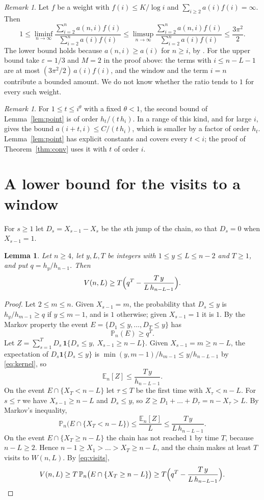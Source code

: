\documentclass[11pt]{amsart}
\newtheorem{lemma}[theorem]{Lemma}
\theoremstyle{remark}
\newtheorem{remark}[theorem]{Remark}
\numberwithin{equation}{section}
\newcommand{\E}{\mathbb{E}}
\renewcommand{\P}{\mathbb{P}}
\newcommand{\ind}{\mathbf{1}}
\begin{document}
\begin{remark}\label{rem:ratio}
Let $f$ be a weight with $f(i)\le K/\log i$ and $\sum_{i\ge2}a(i)f(i)=\infty$. Then
\[
1\le\liminf_{n\to\infty}\frac{\sum_{i=2}^{n}a(n,i)f(i)}{\sum_{i=2}^{n}a(i)f(i)}
\le\limsup_{n\to\infty}\frac{\sum_{i=2}^{n}a(n,i)f(i)}{\sum_{i=2}^{n}a(i)f(i)}\le\frac{3\pi^2}{2}.
\]
The lower bound holds because $a(n,i)\ge a(i)$ for $n\ge i$, by \cite[Theorem~1.1(i)]{BCM}. For the upper bound take
$\varepsilon=1/3$ and $M=2$ in the proof above: the terms with $i\le n-L-1$ are at most $(3\pi^2/2)\,a(i)f(i)$, and the
window and the term $i=n$ contribute a bounded amount. We do not know whether the ratio tends to $1$ for every such
weight.
\end{remark}

\begin{remark}\label{rem:bcm}
For $1\le t\le i^{\theta}$ with a fixed $\theta<1$, the second bound of Lemma~\ref{lem:point} is of order $h_t/(t\,h_i)$.
In a range of this kind, and for large $i$, \cite[Theorem~1.1(iii)]{BCM} gives the bound $a(i+t,i)\le C/(t\,h_i)$,
which is smaller by a factor of order $h_t$. Lemma~\ref{lem:point} has explicit constants and covers every $t<i$; the
proof of Theorem~\ref{thm:conv} uses it with $t$ of order $i$.
\end{remark}

\section{A lower bound for the visits to a window}\label{sec:lower}

For $s\ge1$ let $D_s=X_{s-1}-X_s$ be the $s$th jump of the chain, so that $D_s=0$ when $X_{s-1}=1$.

\begin{lemma}\label{lem:lower}
Let $n\ge4$, let $y,L,T$ be integers with $1\le y\le L\le n-2$ and $T\ge1$, and put $q=h_y/h_{n-1}$. Then
\[
V(n,L)\ge T\Bigl(q^{T}-\frac{T\,y}{L\,h_{n-L-1}}\Bigr).
\]
\end{lemma}

\begin{proof}
Let $2\le m\le n$. Given $X_{s-1}=m$, the probability that $D_s\le y$ is $h_y/h_{m-1}\ge q$ if $y\le m-1$, and is $1$
otherwise; given $X_{s-1}=1$ it is $1$. By the Markov property the event $E=\{D_1\le y,\dots,D_T\le y\}$ has
\[
\P_n(E)\ge q^{T}.
\]
Let $Z=\sum_{s=1}^{T}D_s\,\ind\{D_s\le y,\ X_{s-1}\ge n-L\}$. Given $X_{s-1}=m\ge n-L$, the expectation of
$D_s\ind\{D_s\le y\}$ is $\min(y,m-1)/h_{m-1}\le y/h_{n-L-1}$ by \eqref{eq:kernel}, so
\[
\E_n[Z]\le\frac{T\,y}{h_{n-L-1}}.
\]
On the event $E\cap\{X_T<n-L\}$ let $\tau\le T$ be the first time with $X_\tau<n-L$. For $s\le\tau$ we have
$X_{s-1}\ge n-L$ and $D_s\le y$, so $Z\ge D_1+\dots+D_\tau=n-X_\tau>L$. By Markov's inequality,
\[
\P_n\bigl(E\cap\{X_T<n-L\}\bigr)\le\frac{\E_n[Z]}{L}\le\frac{T\,y}{L\,h_{n-L-1}}.
\]
On the event $E\cap\{X_T\ge n-L\}$ the chain has not reached $1$ by time $T$, because $n-L\ge2$. Hence
$n-1\ge X_1>\dots>X_T\ge n-L$, and the chain makes at least $T$ visits to $W(n,L)$. By \eqref{eq:visits},
\[
V(n,L)\ge T\,\P_n\bigl(E\cap\{X_T\ge n-L\}\bigr)\ge T\Bigl(q^{T}-\frac{T\,y}{L\,h_{n-L-1}}\Bigr).\qedhere
\]
\end{proof}
\end{document}
